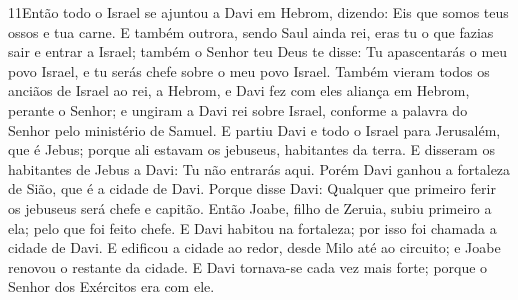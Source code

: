 \medskip

\lettrine{11} Então todo o Israel se ajuntou a Davi em Hebrom,
dizendo: Eis que somos teus ossos e tua carne. E também outrora,
sendo Saul ainda rei, eras tu o que fazias sair e entrar a Israel;
também o Senhor teu Deus te disse: Tu apascentarás o meu povo
Israel, e tu serás chefe sobre o meu povo Israel. Também vieram
todos os anciãos de Israel ao rei, a Hebrom, e Davi fez com eles
aliança em Hebrom, perante o Senhor; e ungiram a Davi rei sobre
Israel, conforme a palavra do Senhor pelo ministério de Samuel.
E partiu Davi e todo o Israel para Jerusalém, que é Jebus;
porque ali estavam os jebuseus, habitantes da terra. E disseram
os habitantes de Jebus a Davi: Tu não entrarás aqui. Porém Davi
ganhou a fortaleza de Sião, que é a cidade de Davi. Porque disse
Davi: Qualquer que primeiro ferir os jebuseus será chefe e capitão.
Então Joabe, filho de Zeruia, subiu primeiro a ela; pelo que foi
feito chefe. E Davi habitou na fortaleza; por isso foi chamada a
cidade de Davi. E edificou a cidade ao redor, desde Milo até ao
circuito; e Joabe renovou o restante da cidade. E Davi
tornava-se cada vez mais forte; porque o Senhor dos Exércitos era
com ele.

